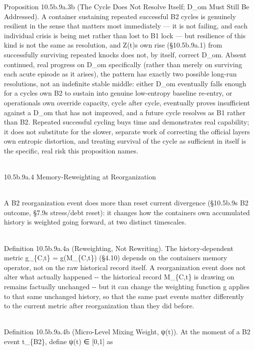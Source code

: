 \documentclass[
]{article}
\begin{document}
Proposition 10.5b.9a.3b (The Cycle Does Not Resolve Itself; D\_om Must
Still Be Addressed). A container sustaining repeated successful B2
cycles is genuinely resilient in the sense that matters most immediately
--- it is not failing, and each individual crisis is being met rather
than lost to B1 lock --- but resilience of this kind is not the same as
resolution, and Z(t)s own rise (§10.5b.9a.1) from successfully surviving
repeated knocks does not, by itself, correct D\_om. Absent continued,
real progress on D\_om specifically (rather than merely on surviving
each acute episode as it arises), the pattern has exactly two possible
long-run resolutions, not an indefinite stable middle: either D\_om
eventually falls enough for a cycles own B2 to sustain into genuine
low-entropy baseline re-entry, or operationals own override capacity,
cycle after cycle, eventually proves insufficient against a D\_om that
has not improved, and a future cycle resolves as B1 rather than B2.
Repeated successful cycling buys time and demonstrates real capability;
it does not substitute for the slower, separate work of correcting the
official layers own entropic distortion, and treating survival of the
cycle as sufficient in itself is the specific, real risk this
proposition names.\\
\strut \\
10.5b.9a.4 Memory-Reweighting at Reorganization\\
\strut \\
A B2 reorganization event does more than reset current divergence
(§10.5b.9\textquotesingle s B2 outcome, §7.9\textquotesingle s
stress/debt reset): it changes how the container\textquotesingle s own
accumulated history is weighted going forward, at two distinct
timescales.\\
\strut \\
Definition 10.5b.9a.4a (Reweighting, Not Rewriting). The
history-dependent metric g\_\{C,t\} = g(M\_\{C,t\}) (§4.10) depends on
the container\textquotesingle s memory operator, not on the raw
historical record itself. A reorganization event does not alter what
actually happened -\/- the historical record M\_\{C,t\} is drawing on
remains factually unchanged -\/- but it can change the weighting
function g applies to that same unchanged history, so that the same past
events matter differently to the current metric after reorganization
than they did before.\\
\strut \\
Definition 10.5b.9a.4b (Micro-Level Mixing Weight, ψ(t)). At the moment
of a B2 event t\_\{B2\}, define ψ(t) ∈ {[}0,1{]} as
\end{document}

